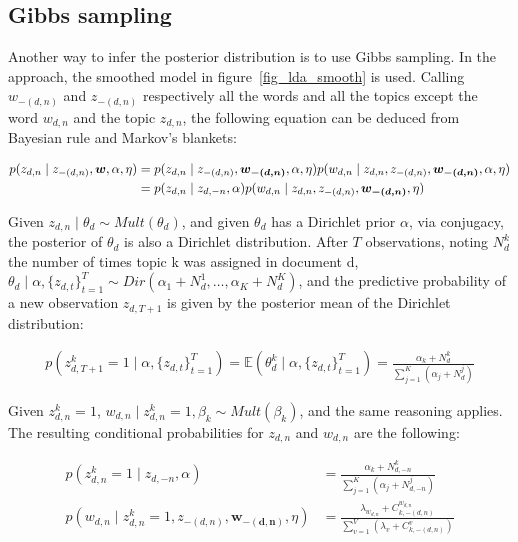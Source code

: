 \documentclass[12pt,a4paper,onecolumn]{article}
\begin{document}
\subsection{Gibbs sampling}

Another way to infer the posterior distribution is to use Gibbs sampling. In the approach, the smoothed model in figure~\ref{fig_lda_smooth} is used. Calling \(w_{-(d,n)}\) and  \(z_{-(d,n)}\) respectively all the words and all the topics except the word \(w_{d,n}\) and the topic \(z_{d,n}\), the following equation can be deduced from Bayesian rule and Markov's blankets:

\begin{align}
	p(z_{d,n} \mid z_{-(d,n)}, \bm{w}, \alpha, \eta) &= p(z_{d,n} \mid z_{-(d,n)}, \bm{w_{-(d,n)}}, \alpha, \eta) p(w_{d,n} \mid z_{d,n}, z_{-(d,n)}, \bm{w_{-(d,n)}}, \alpha, \eta) \notag\\
	&= p(z_{d,n} \mid z_{d,-n}, \alpha) p(w_{d,n} \mid z_{d,n}, z_{-(d,n)}, \bm{w_{-(d,n)}}, \eta)
	\label{eq_gibbs_z}
\end{align}

Given \(z_{d,n} \mid \theta_d \sim Mult(\theta_d)\), and given \(\theta_d\) has a Dirichlet prior \(\alpha\), via conjugacy, the posterior of \(\theta_d\) is also a Dirichlet distribution. After \(T\) observations, noting \(N_d^k\) the number of times topic k was assigned in document d, \(\theta_d \mid \alpha, \{z_{d,t}\}_{t=1}^T \sim Dir(\alpha_1 + N_d^1, \dots, \alpha_K + N_d^K)\), and the predictive probability of a new observation \(z_{d,{T+1}}\) is given by the posterior mean of the Dirichlet distribution:

\begin{align}
	p(z_{d,{T+1}}^k = 1 \mid \alpha, \{z_{d,t}\}_{t=1}^T) = \mathbb{E}(\theta_d^k \mid \alpha, \{z_{d,t}\}_{t=1}^T) = \frac{\alpha_k + N_{d}^k}{\sum_{j=1}^K\left(\alpha_j + N_{d}^j\right)}
\end{align}

Given \(z_{d,n}^k = 1\), \(w_{d,n} \mid z_{d,n}^k = 1, \beta_k  \sim Mult(\beta_k)\), and the same reasoning applies. The resulting conditional probabilities for \(z_{d,n}\) and \(w_{d,n}\) are the following:

\begin{align}
	p(z_{d,n}^k = 1 \mid z_{d,-n}, \alpha) &= \frac{\alpha_k + N_{d,-n}^k}{\sum_{j=1}^K \left(\alpha_j + N_{d,-n}^j\right)} \label{eq_gibbs_cond_z}\\
		p(w_{d,n} \mid z_{d,n}^k = 1, z_{-(d,n)}, \bm{w_{-(d,n)}}, \eta) &= \frac{\lambda_{w_{d,n}} + C_{k,-(d,n)}^{w_{d,n}}}{\sum_{v=1}^V\left(\lambda_v + C_{k,-(d,n)}^{v}\right)} \label{eq_gibbs_cond_w}
\end{align}
\end{document}
